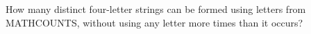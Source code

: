 How many distinct four-letter strings can be formed using letters from MATHCOUNTS, without using any letter more times than it occurs?
